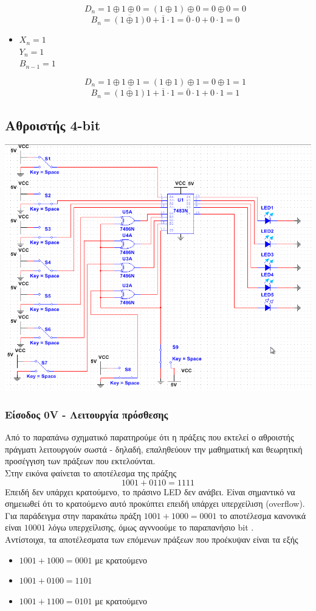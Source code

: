 \documentclass{article}
\begin{document}
\begin{itemize}
	\[D_n = 1 \oplus 1 \oplus 0 = (1 \oplus 1) \oplus 0 = 0 \oplus 0 = 0\]
	\[B_n = \overline{(1 \oplus 1)}0 + \overline{1} \cdot 1 =
		\overline{0} \cdot 0 + 0 \cdot 1 = 0\]

	\item
	$X_n = 1$ \\
	$Y_n = 1$ \\
	$B_{n-1} = 1$

	\[D_n = 1 \oplus 1 \oplus 1 = (1 \oplus 1) \oplus 1 = 0 \oplus 1 = 1\]
	\[B_n = \overline{(1 \oplus 1)}1 + \overline{1} \cdot 1 =
		\overline{0} \cdot 1 + 0 \cdot 1 = 1\]

\end{itemize}

\subsection{Αθροιστής 4-bit}
\includegraphics[width=\textwidth]{./res/fa7486.png}

\subsubsection{Είσοδος 0V - Λειτουργία πρόσθεσης}
Από το παραπάνω σχηματικό παρατηρούμε ότι η πράξεις που εκτελεί ο αθροιστής
πράγματι λειτουργούν σωστά - δηλαδή, επαληθεύουν την μαθηματική και θεωρητική
προσέγγιση των πράξεων που εκτελούνται. \\
Στην εικόνα φαίνεται το αποτέλεσμα της πράξης
\[1001 + 0110 = 1111\]
Επειδή δεν υπάρχει κρατούμενο, το πράσινο LED δεν ανάβει. Είναι σημαντικό να 
σημειωθεί ότι το κρατούμενο αυτό προκύπτει επειδή υπάρχει υπερχείλιση (overflow).
Για παράδειγμα στην παρακάτω πράξη $1001 + 1000 = 0001$ το αποτέλεσμα κανονικά 
είναι $10001$ λόγω υπερχείλισης, όμως αγννοούμε το παραπανήσιο bit \cite{efstathiou}. \\
Αντίστοιχα, τα αποτέλεσματα των επόμενων πράξεων που προέκυψαν είναι τα εξής
\begin{itemize}
    \item $1001 + 1000 = 0001$ με κρατούμενο
    \item $1001 + 0100 = 1101$
    \item $1001 + 1100 = 0101$ με κρατούμενο
\end{itemize}
\end{document}
